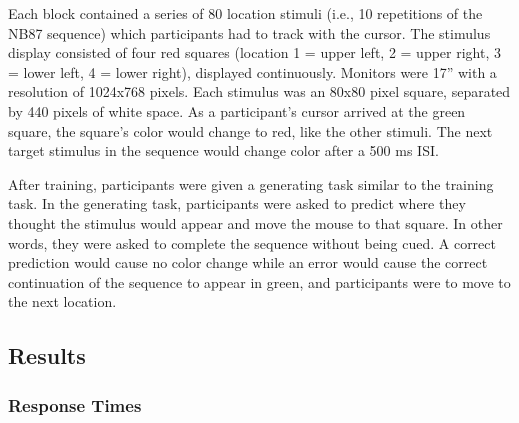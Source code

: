 \documentclass[man,floatsintext]{apa6}
\begin{document}
Each block contained a series of 80 location stimuli (i.e., 10 repetitions of the NB87 sequence) which participants had to track with the cursor. The stimulus display consisted of four red squares (location 1 = upper left, 2 = upper right, 3 = lower left, 4 = lower right), displayed continuously. Monitors were 17'' with a resolution of 1024x768 pixels. Each stimulus was an 80x80 pixel square, separated by 440 pixels of white space. As a participant's cursor arrived at the green square, the square's color would change to red, like the other stimuli. The next target stimulus in the sequence would change color after a 500 ms ISI.

After training, participants were given a generating task similar to the training task. In the generating task, participants were asked to predict where they thought the stimulus would appear and move the mouse to that square. In other words, they were asked to complete the sequence without being cued. A correct prediction would cause no color change while an error would cause the correct continuation of the sequence to appear in green, and participants were to move to the next location. 

\subsection{Results}

\subsubsection{Response Times}
\end{document}
